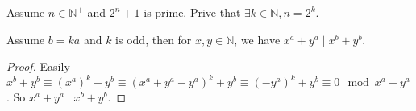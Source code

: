 \documentclass{ctexart}
\newif\ifpreface
\begin{document}
\large
\iffalse
  \setlength{\baselineskip}{1.2em}
  \ifpreface
    
  \else
    \maketitle
  \fi
\fi
{}

\begin{problem}\label{pro:p14.5}
  Assume \(n \in \mathbb{N}^+\) and \(2^n + 1\) is prime. Prive that \(\exists k \in \mathbb{N},n=2^k\).
\end{problem}
\begin{lemma}\label{lem:1}
  Assume \(b=ka\) and \(k\) is odd, then for \(x,y \in \mathbb{N}\), we have \(x^a + y^a \mid x^b + y^b\).
\end{lemma}
\begin{proof}
  Easily \(x^b + y^b \equiv (x^a)^k + y^b \equiv (x^a + y^a - y^a)^k + y^b \equiv (-y^a)^k + y^b \equiv 0 \mod x^a + y^a\).
  So \(x^a + y^a \mid x^b + y^b\).
\end{proof}
\end{document}
